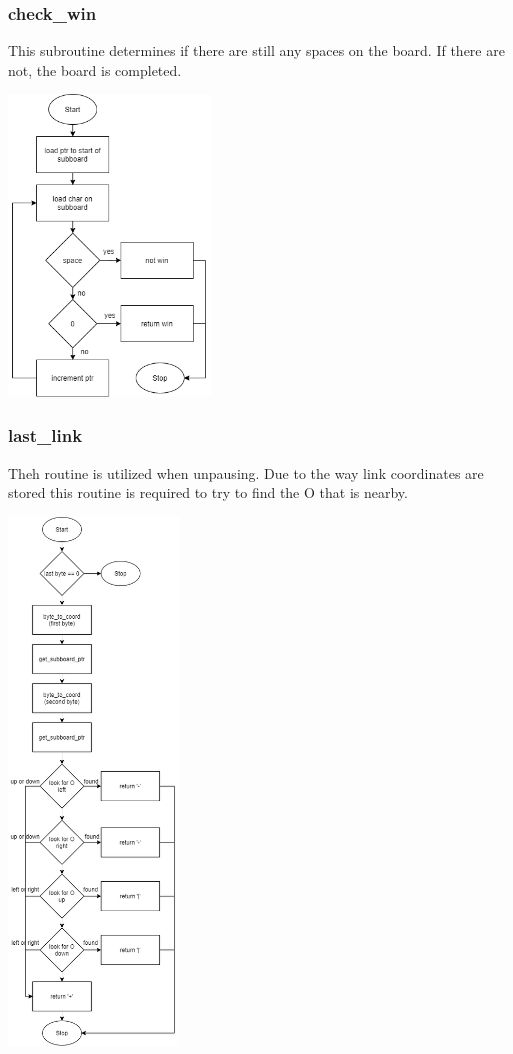 \documentclass{article}
\begin{document}
    \subsubsection{check\_win}
        This subroutine determines if there are still any spaces on the board.
        If there are not, the board is completed.
        \begin{center}
            {\includegraphics[height=8cm]{check_win.png}\centering} 
        \end{center}
        \newpage

    \subsubsection{last\_link}
        Theh routine is utilized when unpausing.  Due to the way link 
        coordinates are stored this routine is required to try to find
        the O that is nearby.
        \begin{center}
            {\includegraphics[height=14cm]{last_link.png}\centering} 
        \end{center}
        \newpage
\end{document}
